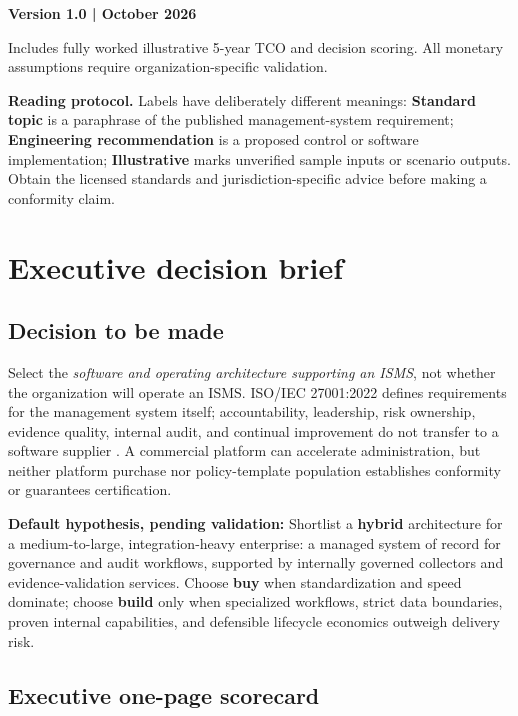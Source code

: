 \documentclass[10pt,letterpaper]{article}
\begin{document}
\vfill
{\sffamily\color{navy}\bfseries Version 1.0 \quad |  October 2026}\par
{\sffamily\color{muted} Includes fully worked illustrative 5-year TCO and decision scoring. All monetary assumptions require organization-specific validation.}
\clearpage
\begin{noteBox}
\textbf{Reading protocol.} Labels have deliberately different meanings: \textbf{Standard topic} is a paraphrase of the published management-system requirement; \textbf{Engineering recommendation} is a proposed control or software implementation; \textbf{Illustrative} marks unverified sample inputs or scenario outputs. Obtain the licensed standards and jurisdiction-specific advice before making a conformity claim.
\end{noteBox}
\tableofcontents
\clearpage

\section{Executive decision brief}
\subsection{Decision to be made}
Select the \emph{software and operating architecture supporting an ISMS}, not whether the organization will operate an ISMS. ISO/IEC 27001:2022 defines requirements for the management system itself; accountability, leadership, risk ownership, evidence quality, internal audit, and continual improvement do not transfer to a software supplier \cite{iso27001,iso27002}. A commercial platform can accelerate administration, but neither platform purchase nor policy-template population establishes conformity or guarantees certification.

\begin{decisionBox}
\textbf{Default hypothesis, pending validation:} Shortlist a \textbf{hybrid} architecture for a medium-to-large, integration-heavy enterprise: a managed system of record for governance and audit workflows, supported by internally governed collectors and evidence-validation services. Choose \textbf{buy} when standardization and speed dominate; choose \textbf{build} only when specialized workflows, strict data boundaries, proven internal capabilities, and defensible lifecycle economics outweigh delivery risk.
\end{decisionBox}

\subsection{Executive one-page scorecard}
\end{document}
